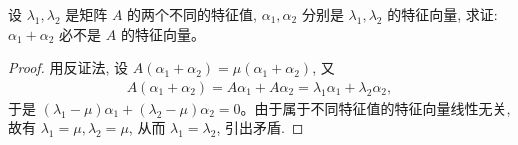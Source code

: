 \documentclass[../../main.tex]{subfiles}%
\begin{document}
\begin{example}
设 $\lambda_1, \lambda_2$ 是矩阵 $A$ 的两个不同的特征值, $\alpha_1, \alpha_2$ 分别是 $\lambda_1, \lambda_2$ 的特征向量, 求证: $\alpha_1 + \alpha_2$ 必不是 $A$ 的特征向量。
\end{example}
\begin{proof}

用反证法, 设 $A(\alpha_1 + \alpha_2) = \mu (\alpha_1 + \alpha_2)$, 又
\begin{align*}
A(\alpha_1 + \alpha_2) = A\alpha_1 + A\alpha_2 
= \lambda_1 \alpha_1 + \lambda_2 \alpha_2,
\end{align*}
于是 $(\lambda_1 - \mu) \alpha_1 + (\lambda_2 - \mu) \alpha_2 = 0$。由于属于不同特征值的特征向量线性无关, 故有 $\lambda_1 = \mu, \lambda_2 = \mu$, 从而 $\lambda_1 = \lambda_2$, 引出矛盾.

\end{proof}
\end{document}

